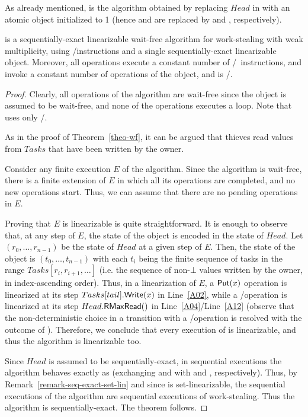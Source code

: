 As already mentioned, \NCWSM is the algorithm obtained by replacing \(Head\) in \WFWSM with an atomic \RangeMaxReg object initialized to 1 (hence \MaxR and \MaxW are replaced by \RMaxR and \RMaxW, respectively).


\begin{theorem}\label{theo-wf-nc}
  \NCWSM is a sequentially-exact linearizable wait-free algorithm for work-stealing with weak multiplicity, using \R/\W instructions and a single sequentially-exact linearizable \RangeMaxReg object.  Moreover, all operations execute a constant number of \R/\W\ instructions, and invoke a constant number of operations of the \RangeMaxReg object, and \Put is \R/\W.
\end{theorem}

\begin{proof}

Clearly, all operations of the algorithm are wait-free since the \RangeMaxReg object is assumed to be wait-free, and none of the operations executes a loop.  Note that \Put uses only \R/\W.

As in the proof of Theorem~\ref{theo-wf}, it can be argued that thieves read values from \(Tasks\) that have been written by the owner.

Consider any finite execution \(E\) of the algorithm.  Since the algorithm is wait-free, there is a finite extension of \(E\) in which all its operations are completed, and no new operations start. Thus, we can assume that there are no pending operations in \(E\).

Proving that \(E\) is linearizable is quite straightforward. It is enough to observe that, at any step of \(E\), the state of the object is encoded in the state of \(Head\). Let \((r_0, \hdots, r_{n-1})\) be the state of \(Head\) at a given step of \(E\). Then, the state of the object is \((t_0, \hdots, t_{n-1})\) with each \(t_i\) being the finite sequence of tasks in the range \(Tasks[r_i, r_{i+1}, \hdots]\) (i.e. the sequence of non-\(\bot\) values written by the owner, in index-ascending order).  Thus, in a linearization of \(E\), a \({\sf \small Put}(x)\) operation is linearized at its step \(Tasks[tail].{\sf \small Write}(x)\) in Line~\ref{A02}, while a \Take/\Steal operation is linearized at its step \(Head.{\sf \small RMaxRead}()\) in Line~\ref{A04}/Line~\ref{A12} (observe that the non-deterministic choice in a transition with a \Take/\Steal operation is resolved with the outcome of \RMaxR).  Therefore, we conclude that every execution of \NCWSM is linearizable, and thus the algorithm is linearizable too.

Since $Head$ is assumed to be sequentially-exact, in sequential executions the algorithm behaves exactly as \WFWSM (exchanging \RMaxR and \RMaxW with \MaxR and \MaxW, respectively).  Thus, by Remark~\ref{remark-seq-exact-set-lin} and since \WFWSM is set-linearizable, the sequential executions of the algorithm are sequential executions of work-stealing.  Thus the algorithm is sequentially-exact.  The theorem follows.

\end{proof}

